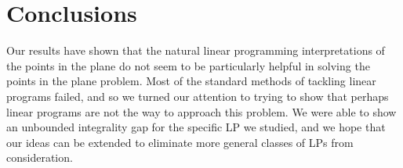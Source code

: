 \documentclass[11pt]{article}
\begin{document}
\section{Conclusions}

Our results have shown that the natural linear programming interpretations of the points in the plane do not seem to be particularly helpful in solving the points in the plane problem. Most of the standard methods of tackling linear programs failed, and so we turned our attention to trying to show that perhaps linear programs are not the way to approach this problem. We were able to show an unbounded integrality gap for the specific LP we studied, and we hope that our ideas can be extended to eliminate more general classes of LPs from consideration.



\end{document}
